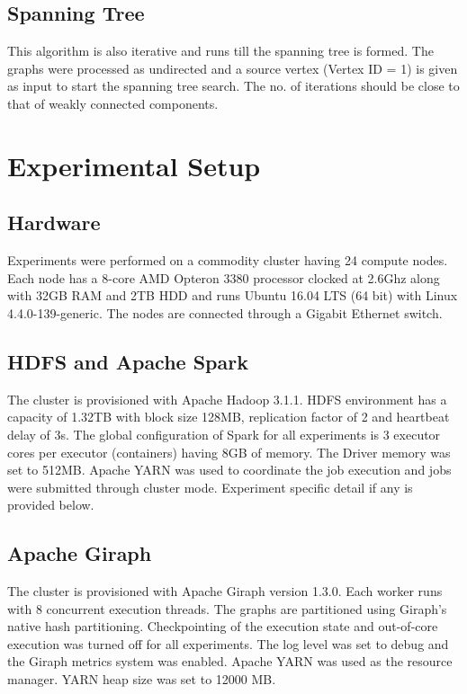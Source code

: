 \documentclass[11pt,a4paper,oneside]{article}
\begin{document}
	\subsection{Spanning Tree}
	This algorithm is also iterative and runs till the spanning tree is formed. The graphs were processed as undirected and a source vertex (Vertex ID = 1) is given as input to start the spanning tree search. The no. of iterations should be close to that of weakly connected components.
	     
    \section{Experimental Setup}
    
    \subsection{Hardware}
    Experiments were performed on a commodity cluster having 24 compute nodes. Each node has a 8-core AMD Opteron 3380 processor clocked at 2.6Ghz along with 32GB RAM and 2TB HDD and runs Ubuntu 16.04 LTS (64 bit) with Linux 4.4.0-139-generic. The nodes are connected through a Gigabit Ethernet switch.
    
    \subsection{HDFS and Apache Spark}
    The cluster is provisioned with Apache Hadoop 3.1.1. HDFS environment has a capacity of 1.32TB with block size 128MB, replication factor of 2 and heartbeat delay of 3s. The global configuration of Spark for all experiments is 3 executor cores per executor (containers) having 8GB of memory. The Driver memory was set to 512MB. Apache YARN was used to coordinate the job execution and jobs were submitted through cluster mode. Experiment specific detail if any is provided below.
    
    \subsection{Apache Giraph}
    The cluster is provisioned with Apache Giraph version 1.3.0. Each worker runs with 8 concurrent execution threads. The graphs are partitioned using Giraph's native hash partitioning. Checkpointing of the execution state and out-of-core execution was turned off for all experiments. The log level was set to debug and the Giraph metrics system was enabled. Apache YARN was used as the resource manager. YARN heap size was set to 12000 MB. 
    
\end{document}
